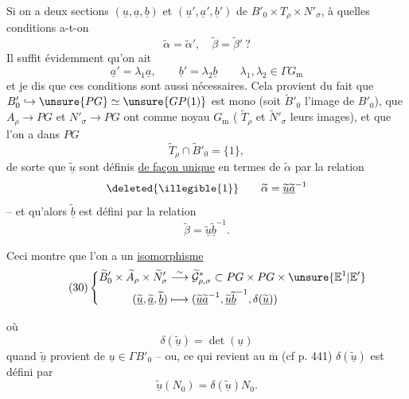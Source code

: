 Si on a deux sections $(\underline u,\underline a,\underline b)$ et
$(\underline u',\underline a',\underline b')$ de
$B'_0\times T_\rho\times N'_\sigma$, à quelles
conditions a-t-on
\[
\tag{27}
\widetilde\alpha=\widetilde\alpha',\quad
\widetilde\beta=\widetilde\beta'\ ?
\]
Il suffit évidemment qu'on ait
\[
\tag{28}
\underline a'=\lambda_1\underline a,\qquad
\underline b'=\lambda_2\underline b
\qquad \lambda_1,\lambda_2\in\Gamma G_{\mathrm m}
\]
et je dis que ces conditions sont aussi nécessaires.
Cela provient du fait que
$B'_0\hookrightarrow\unsure{PG}\simeq\unsure{GP(1)}$
est mono (soit $\widetilde B'_0$ l'image de $B'_0$),
que  $A_\rho\to PG$ et
$N'_\sigma\longrightarrow PG$ ont comme noyau $G_{\mathrm m}$
( $\widetilde T_\rho$ et $\widetilde N'_\sigma$ leurs images),
et que l'on a dans $PG$
\[
\tag{29}
\widetilde T_\rho\cap\widetilde B'_0=\{1\},
\]
de sorte que  $\widetilde{\underline u}$
sont définis \uline{de façon unique} en termes de $\widetilde\alpha$
par la relation
\[
\deleted{\illegible{1}}\qquad
\widetilde\alpha=\widetilde{\underline u}\widetilde{\underline a}^{-1}
\]
-- et qu'alors $\widetilde{\underline b}$ est défini
par la relation
\[
\widetilde\beta=\widetilde{\underline u}\widetilde{\underline b}^{-1}.
\]

Ceci montre que  l'on a un \uline{isomorphisme}
\[
\tag{30}
\left\{\begin{aligned}
\widetilde B'_0\times\widetilde A_\rho\times\widetilde N'_\sigma
&\overset{\sim}{\longrightarrow}
\widetilde{\mathcal G}^{*}_{\rho,\sigma}
\subset PG\times PG\times\unsure{\mathbb E^1|\mathbb E'}\\
(\widetilde{\underline u},\widetilde{\underline a},\widetilde{\underline b})
&\longmapsto
(\widetilde{\underline u}\widetilde{\underline a}^{-1},
\widetilde{\underline u}\widetilde{\underline b}^{-1},
\delta(\widetilde{\underline u}))
\end{aligned}\right.
\]


où
\[
\tag{31}
\delta(\widetilde{\underline u})=\det(\underline u)
\]
quand $\widetilde{\underline u}$ provient de $\underline u\in\Gamma B'_0$ --
ou, ce qui revient au $\overline{\mathrm m}$ (cf p. 441)
$\delta(\widetilde{\underline u})$ est défini par
\[
\tag{32}
\widetilde{\underline u}(N_0)=\delta(\widetilde{\underline u})N_0.
\]

